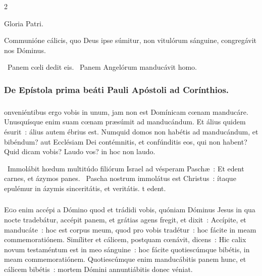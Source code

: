 \documentclass[9pt,twoside]{extarticle}
\begin{document}
\begin{multicols}{2}
{{Gloria Patri.

\begin{tightlist}{}
\item {} Communióne cálicis, quo Deus ipse súmitur, non vitulórum sánguine, congregávit nos Dóminus.
\item {}~Panem cœli dedit eis. ~Panem Angelórum manducávit homo.
\item {}
\end{tightlist}

\subsubsection*{\center De Epístola prima beáti Pauli Apóstoli ad Corínthios.}
\subsubsection*{\center {}}
onveniéntibus ergo vobis in unum, jam non est Domínicam cœnam manducáre. Unusquísque enim suam cœnam præsúmit ad manducándum. Et álius quidem ésurit~: álius autem ébrius est. Numquid domos non habétis ad manducándum, et bibéndum? aut Ecclésiam Dei contémnitis, et confúnditis eos, qui non habent? Quid dicam vobis? Laudo vos? in hoc non laudo.

\begin{tightlist}{}
\item {}~Immolábit hœdum multitúdo filiórum Israel ad vésperam Paschæ~: \textred{*} Et edent carnes, et ázymos panes. ~Pascha nostrum immolátus est Christus~: ítaque epulémur in ázymis sinceritátis, et veritátis. t edent.
\end{tightlist}

\subsubsection*{\center{}}
\lettrine{E}go enim accépi a Dómino quod et trádidi vobis, quóniam Dóminus Jesus in qua nocte tradebátur, accépit panem, et grátias agens fregit, et dixit~: Accípite, et manducáte~: hoc est corpus meum, quod pro vobis tradétur~: hoc fácite in meam commemoratiónem. Simíliter et cálicem, postquam cœnávit, dicens~: Hic calix novum testaméntum est in meo sánguine~: hoc fácite quotiescúmque bibétis, in meam commemoratiónem. Quotiescúmque enim manducábitis panem hunc, et cálicem bibétis~: mortem Dómini annuntiábitis donec véniat.

}}
\end{multicols}
\end{document}

